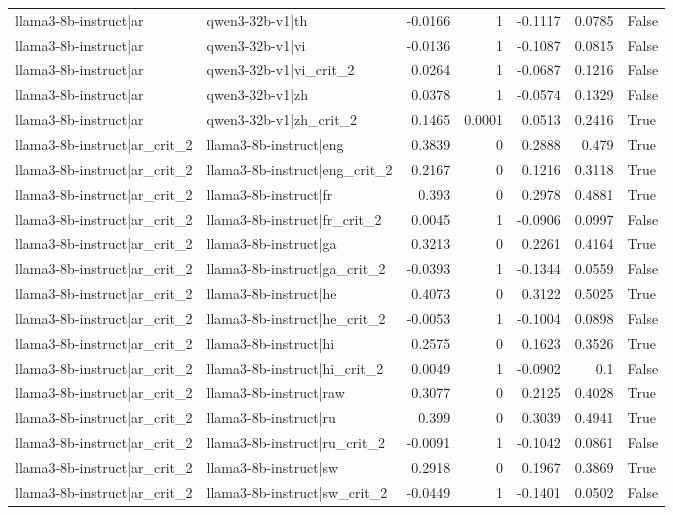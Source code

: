 \begin{table}
\begin{tabular}{l l r r r r l}
llama3-8b-instruct|ar & qwen3-32b-v1|th & -0.0166 & 1 & -0.1117 & 0.0785 & False \\
llama3-8b-instruct|ar & qwen3-32b-v1|vi & -0.0136 & 1 & -0.1087 & 0.0815 & False \\
llama3-8b-instruct|ar & qwen3-32b-v1|vi_crit_2 & 0.0264 & 1 & -0.0687 & 0.1216 & False \\
llama3-8b-instruct|ar & qwen3-32b-v1|zh & 0.0378 & 1 & -0.0574 & 0.1329 & False \\
llama3-8b-instruct|ar & qwen3-32b-v1|zh_crit_2 & 0.1465 & 0.0001 & 0.0513 & 0.2416 & True \\
llama3-8b-instruct|ar_crit_2 & llama3-8b-instruct|eng & 0.3839 & 0 & 0.2888 & 0.479 & True \\
llama3-8b-instruct|ar_crit_2 & llama3-8b-instruct|eng_crit_2 & 0.2167 & 0 & 0.1216 & 0.3118 & True \\
llama3-8b-instruct|ar_crit_2 & llama3-8b-instruct|fr & 0.393 & 0 & 0.2978 & 0.4881 & True \\
llama3-8b-instruct|ar_crit_2 & llama3-8b-instruct|fr_crit_2 & 0.0045 & 1 & -0.0906 & 0.0997 & False \\
llama3-8b-instruct|ar_crit_2 & llama3-8b-instruct|ga & 0.3213 & 0 & 0.2261 & 0.4164 & True \\
llama3-8b-instruct|ar_crit_2 & llama3-8b-instruct|ga_crit_2 & -0.0393 & 1 & -0.1344 & 0.0559 & False \\
llama3-8b-instruct|ar_crit_2 & llama3-8b-instruct|he & 0.4073 & 0 & 0.3122 & 0.5025 & True \\
llama3-8b-instruct|ar_crit_2 & llama3-8b-instruct|he_crit_2 & -0.0053 & 1 & -0.1004 & 0.0898 & False \\
llama3-8b-instruct|ar_crit_2 & llama3-8b-instruct|hi & 0.2575 & 0 & 0.1623 & 0.3526 & True \\
llama3-8b-instruct|ar_crit_2 & llama3-8b-instruct|hi_crit_2 & 0.0049 & 1 & -0.0902 & 0.1 & False \\
llama3-8b-instruct|ar_crit_2 & llama3-8b-instruct|raw & 0.3077 & 0 & 0.2125 & 0.4028 & True \\
llama3-8b-instruct|ar_crit_2 & llama3-8b-instruct|ru & 0.399 & 0 & 0.3039 & 0.4941 & True \\
llama3-8b-instruct|ar_crit_2 & llama3-8b-instruct|ru_crit_2 & -0.0091 & 1 & -0.1042 & 0.0861 & False \\
llama3-8b-instruct|ar_crit_2 & llama3-8b-instruct|sw & 0.2918 & 0 & 0.1967 & 0.3869 & True \\
llama3-8b-instruct|ar_crit_2 & llama3-8b-instruct|sw_crit_2 & -0.0449 & 1 & -0.1401 & 0.0502 & False \\

\end{tabular}
\end{table}
